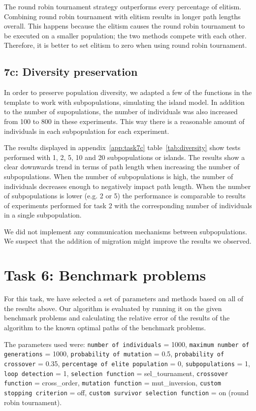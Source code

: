\documentclass{report}
\begin{document}
The round robin tournament strategy outperforms every percentage of elitism. Combining round robin tournament with elitism results in longer path lengths overall. This happens because the elitism causes the round robin tournament to be executed on a smaller population; the two methods compete with each other. Therefore, it is better to set elitism to zero when using round robin tournament.


\subsection{7c: Diversity preservation}
In order to preserve population diversity, we adapted a few of the functions in the template to work with subpopulations, simulating the island model. In addition to the number of supopulations, the number of individuals was also increased from 100 to 800 in these experiments. This way there is a reasonable amount of individuals in each subpopulation for each experiment. 

The results displayed in appendix~\ref{app:task7c} table~\ref{tab:diversity} show tests performed with 1, 2, 5, 10 and 20 subpopulations or islands. The results show a clear downwards trend in terms of path length when increasing the number of subpopulations. When the number of subpopulations is high, the number of individuals decreases enough to negatively impact path length. When the number of subpopulations is lower (e.g. 2 or 5) the performance is comparable to results of experiments performed for task 2 with the corresponding number of individuals in a single subpopulation.

We did not implement any communication mechanisms between subpopulations. We suspect that the addition of migration might improve the results we observed.

\section{Task 6: Benchmark problems}
For this task, we have selected a set of parameters and methods based on all of the results above. Our algorithm is evaluated by running it on the given benchmark problems and calculating the relative error of the results of the algorithm to the known optimal paths of the benchmark problems. 

The parameters used were: \texttt{number of individuals} = 1000, \texttt{maximum number of generations} = 1000, \texttt{probability of mutation} = 0.5, \texttt{probability of crossover} = 0.35, \texttt{percentage of elite population} = 0, \texttt{subpopulations} = 1, \texttt{loop detection} = 1, \texttt{selection function} = sel\_tournament, \texttt{crossover function} = cross\_order, \texttt{mutation function} = mut\_inversion, \texttt{custom stopping criterion} = off, \texttt{custom survivor selection function} = on (round robin tournament).
\end{document}
